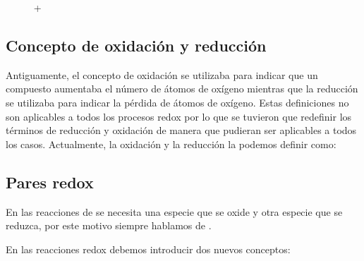 \begin{centeredequation}
    \ \ \ \ch{+} \ \ + \ \ \ch{->}  \ch{+} \  \ch{+} \ \ 
\end{centeredequation}

\subsection{Concepto de oxidación y reducción}\label{subsec:concepto-de-oxidacion-y-reduccion}

Antiguamente, el concepto de oxidación se utilizaba para indicar que un compuesto aumentaba el número de átomos de oxígeno mientras que la reducción se utilizaba para indicar la pérdida de átomos de oxígeno.
Estas definiciones no son aplicables a todos los procesos redox por lo que se tuvieron que redefinir los términos de reducción y oxidación de manera que pudieran ser aplicables a todos los casos.
Actualmente, la oxidación y la reducción la podemos definir como:



\subsection{Pares redox}\label{subsec:pares-redox}

En las reacciones de  se necesita una especie que se oxide y otra especie que se reduzca, por este motivo siempre hablamos de .

En las reacciones redox debemos introducir dos nuevos conceptos:



